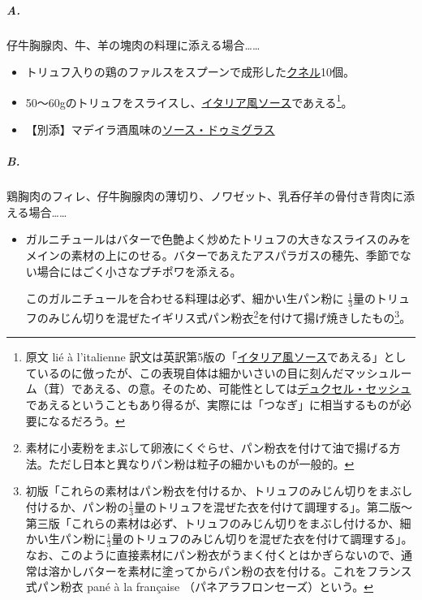 \begin{recette}


\hypertarget{a.}{%
\subparagraph{A.}\label{a.}}

仔牛胸腺肉、牛、羊の塊肉の料理に添える場合\ldots{}\ldots{}

\begin{itemize}
\item
  トリュフ入りの鶏のファルスをスプーンで成形した\protect\hyperlink{quenelles}{クネル}10個。
\item
  50〜60gのトリュフをスライスし、\protect\hyperlink{sauce-italienne}{イタリア風ソース}であえる\footnote{原文
    lié à l'italienne
    訳文は英訳第5版の「\protect\hyperlink{sauce-italienne}{イタリア風ソース}であえる」としているのに倣ったが、この表現自体は細かいさいの目に刻んだマッシュルーム（茸）であえる、の意。そのため、可能性としては\protect\hyperlink{duxelles-seche}{デュクセル・セッシュ}であえるということもあり得るが、実際には「つなぎ」に相当するものが必要になるだろう。}。
\item
  【別添】マデイラ酒風味の\protect\hyperlink{sauce-demi-glace}{ソース・ドゥミグラス}
\end{itemize}

\hypertarget{b.}{%
\subparagraph{B.}\label{b.}}

鶏胸肉のフィレ、仔牛胸腺肉の薄切り、ノワゼット、乳呑仔羊の骨付き背肉に添える場合\ldots{}\ldots{}

\begin{itemize}
\item
  ガルニチュールはバターで色艶よく炒めたトリュフの大きなスライスのみをメインの素材の上にのせる。バターであえたアスパラガスの穂先、季節でない場合にはごく小さなプチポワを添える。

  このガルニチュールを合わせる料理は必ず、細かい生パン粉に
  \(\frac{1}{3}\)量のトリュフのみじん切りを混ぜたイギリス式パン粉衣\footnote{素材に小麦粉をまぶして卵液にくぐらせ、パン粉衣を付けて油で揚げる方法。ただし日本と異なりパン粉は粒子の細かいものが一般的。}を付けて揚げ焼きしたもの\footnote{初版「これらの素材はパン粉衣を付けるか、トリュフのみじん切りをまぶし付けるか、パン粉の\(\frac{1}{3}\)量のトリュフを混ぜた衣を付けて調理する」。第二版〜第三版「これらの素材は必ず、トリュフのみじん切りをまぶし付けるか、細かい生パン粉に\(\frac{1}{3}\)量のトリュフのみじん切りを混ぜた衣を付けて調理する」。なお、このように直接素材にパン粉衣がうまく付くとはかぎらないので、通常は溶かしバターを素材に塗ってからパン粉の衣を付ける。これをフランス式パン粉衣
    pané à la française （パネアラフロンセーズ）という。}。
\end{itemize}


\end{recette}
